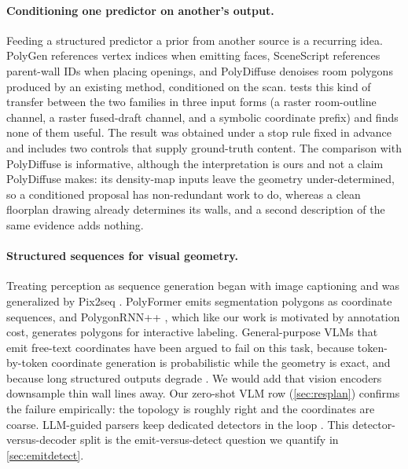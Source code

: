 \documentclass{article}
\begin{document}
\paragraph{Conditioning one predictor on another's output.}
Feeding a structured predictor a prior from another source is a recurring
idea. PolyGen \citep{nash2020polygen} references vertex indices when emitting
faces, SceneScript \citep{avetisyan2024scenescript} references parent-wall IDs
when placing openings, and PolyDiffuse \citep{chen2023polydiffuse} denoises
room polygons produced by an existing method, conditioned on the scan.
 tests this kind of transfer between the two families in three input
forms (a raster room-outline channel, a raster fused-draft channel, and a
symbolic coordinate prefix) and finds none of them useful. The result was
obtained under a stop rule fixed in advance and includes two controls that
supply ground-truth content. The comparison with PolyDiffuse is informative,
although the interpretation is ours and not a claim PolyDiffuse makes: its
density-map inputs leave the geometry under-determined, so a conditioned
proposal has non-redundant work to do, whereas a clean floorplan drawing already
determines its walls, and a second description of the same evidence adds
nothing.

\paragraph{Structured sequences for visual geometry.}
Treating perception as sequence generation began with image captioning
\citep{vinyals2015show,xu2015showattend} and was generalized by Pix2seq
\citep{chen2021pix2seq,chen2022unified}. PolyFormer \citep{liu2023polyformer}
emits segmentation polygons as coordinate sequences, and PolygonRNN++
\citep{acuna2018polygonrnnpp}, which like our work is motivated by annotation
cost, generates polygons for interactive labeling. General-purpose VLMs that
emit free-text coordinates have been argued to fail on this task, because
token-by-token coordinate generation is probabilistic while the geometry is
exact, and because long structured outputs degrade \citep{floorplanvlm2026}. We
would add that vision encoders downsample thin wall lines away. Our zero-shot
VLM row (\cref{sec:resplan}) confirms the failure empirically: the topology is
roughly right and the coordinates are coarse. LLM-guided parsers
keep dedicated detectors in the loop \citep{ayanzadeh2026llmparse}. This
detector-versus-decoder split is the emit-versus-detect question we quantify
in \cref{sec:emitdetect}.
\end{document}
